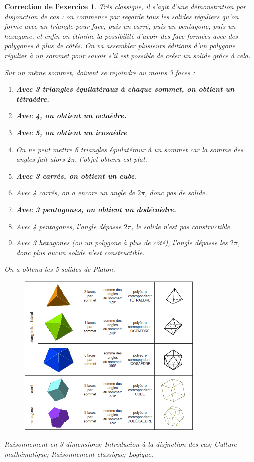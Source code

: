 \documentclass[12pt]{article}
\theoremstyle{break}
\newtheorem{cor}{Correction de l'exercice}
\begin{document}
\begin{cor}
Très classique, il s'agit d'une démonstration par disjonction de cas : on commence par regarde tous les solides réguliers qu'on forme avec un triangle pour face, puis un carré, puis un pentagone, puis un hexagone, et enfin on élimine la possibilité d'avoir des face formées avec des polygones à plus de côtés. On va assembler plusieurs éditions d'un polygone régulier à un sommet pour savoir s'il est possible de créer un solide grâce à cela.

Sur un même sommet, doivent se rejoindre au moins 3 faces :
\begin{enumerate}
\item \textbf{Avec 3 triangles équilatéraux à chaque sommet, on obtient un tétraèdre.}
\item \textbf{Avec 4, on obtient un octaèdre.}
\item \textbf{Avec 5, on obtient un icosaèdre}
\item On ne peut mettre 6 triangles équilatéraux à un sommet car la somme des angles fait alors $2\pi$, l'objet obtenu est plat.
\item \textbf{Avec 3 carrés, on obtient un cube.}
\item Avec 4 carrés, on a encore un angle de $2\pi$, donc pas de solide.
\item \textbf{Avec 3 pentagones, on obtient un dodécaèdre.}
\item Avec 4 pentagones, l'angle dépasse $2\pi$, le solide n'est pas constructible.
\item Avec 3 hexagones (ou un polygone à plus de côté), l'angle dépasse les $2\pi$, donc plus aucun solide n'est constructible.
\end{enumerate}

On a obtenu les 5 solides de Platon.\newline

\begin{figure}[h!]
	\centering
    \includegraphics[width=0.8\textwidth]{PolyedreSolution.jpg}  
\end{figure}

\textit{Raisonnement en 3 dimensions; Introducion à la disjnction des cas; Culture mathématique; Raisonnement classique; Logique.}

\end{cor}
\end{document}

